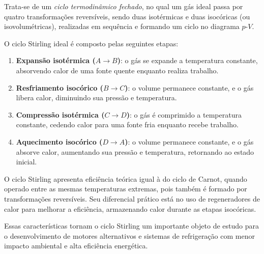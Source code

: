 \documentclass[a4paper,12pt]{article}
\begin{document}
Trata-se de um \colorbox{green!30}{\textit{ciclo termodinâmico fechado}, no qual um gás ideal passa por quatro} \colorbox{green!30}{transformações reversíveis}, sendo duas isotérmicas e duas isocóricas (ou isovolumétricas), realizadas em sequência e formando um ciclo no diagrama \(p\)-\(V\).

O ciclo Stirling ideal é composto pelas seguintes etapas:

\begin{enumerate}
    \item \colorbox{green!30}{\textbf{Expansão isotérmica (\(A \to B\))}}: o gás se expande a temperatura constante, absorvendo calor de uma fonte quente enquanto realiza trabalho.
    \item \colorbox{green!30}{\textbf{Resfriamento isocórico (\(B \to C\))}}: o volume permanece constante, e o gás libera calor, diminuindo sua pressão e temperatura.
    \item \colorbox{green!30}{\textbf{Compressão isotérmica (\(C \to D\))}}: o gás é comprimido a temperatura constante, cedendo calor para uma fonte fria enquanto recebe trabalho.
    \item \colorbox{green!30}{\textbf{Aquecimento isocórico (\(D \to A\))}}: o volume permanece constante, e o gás absorve calor, aumentando sua pressão e temperatura, retornando ao estado inicial.
\end{enumerate}

O \colorbox{green!30}{ciclo Stirling apresenta eficiência teórica igual à do ciclo de Carnot}, quando operado entre as mesmas temperaturas extremas, pois também é formado por transformações reversíveis. Seu diferencial prático está no uso de regeneradores de calor para melhorar a eficiência, armazenando calor durante as etapas isocóricas.

\bigskip

Essas características tornam o ciclo Stirling um importante objeto de estudo para o desenvolvimento de motores alternativos e sistemas de refrigeração com menor impacto ambiental e alta eficiência energética.
\end{document}
